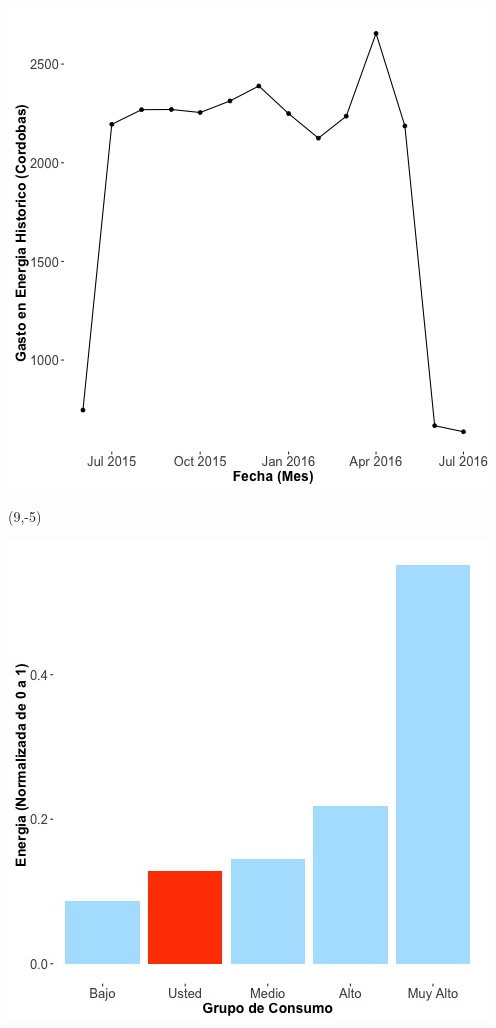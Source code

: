 \documentclass{article}\usepackage[]{graphicx}\usepackage[]{color}
\newenvironment{knitrout}{}{} %
\begin{document}
\begin{knitrout}
\color{fgcolor}
\includegraphics[scale=0.65]{figure/A28_historico_cordobas} 
\end{knitrout}

 \begin{textblock}{1}(9,-5)
\begin{minipage}{20em}
\begingroup

\endgroup
\end{minipage}
\end{textblock}


\begin{knitrout}
\color{fgcolor}
\includegraphics[scale=0.65]{figure/A28_neighbor_plot} 
\end{knitrout}
\end{document}
